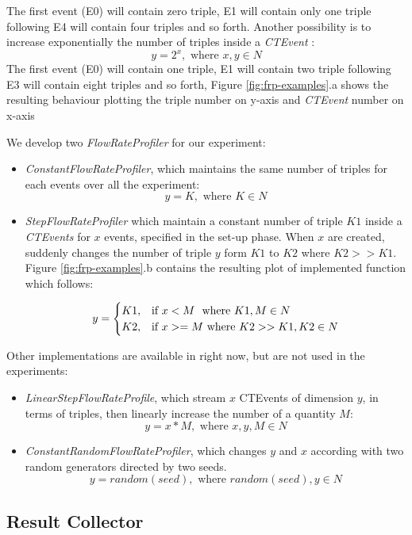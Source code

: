 The first event (E0) will contain zero triple, E1 will contain only one triple following E4 will contain four triples and so forth. Another possibility is to increase exponentially the number of triples inside a \textit{CTEvent} : \[y=2^x, \text{ where } x,y \in N\] 
The first event (E0) will contain one triple, E1 will contain two triple following E3 will contain eight triples and so forth, Figure \ref{fig:frp-examples}.a shows the resulting behaviour plotting the triple number on y-axis and \textit{CTEvent} number on x-axis

We develop two \textit{FlowRateProfiler} for our experiment: 
\begin{itemize}
\item \textit{ConstantFlowRateProfiler}, which maintains the same number of triples for each events over all the experiment: \\
\[y=K, \text{ where } K \in N \]

\item \textit{StepFlowRateProfiler}  which maintain a constant number of triple $K1$ inside a \textit{CTEvents} for $x$ events, specified in the set-up phase. When $x$ are created,  suddenly changes the number of triple $y$ form $K1$ to $K2$ where $K2 >> K1$. Figure \ref{fig:frp-examples}.b contains the resulting plot of implemented function which follows:

\[
y=
\begin{cases}
K1, &\text{if $x < M$ } $ where $ K1, M \in N\\
K2, &\text{if $x >= M$} $ where $ K2 >> K1, K2 \in N
\end{cases}
\]


\end{itemize}
Other implementations are available in \name right now, but are not used in the experiments:
\begin{itemize}
\item \textit{LinearStepFlowRateProfile}, which stream $x$ CTEvents of dimension $y$, in terms of triples, then linearly increase the number of a quantity $M$: \[y=x*M, \text{ where } x,y,M \in N\]
\item \textit{ConstantRandomFlowRateProfiler}, which changes $y$ and $x$ according with two random generators directed by two seeds. \[y=random(seed), \text{ where } random(seed),y \in N\]
\end{itemize}


\subsection{Result Collector} 

